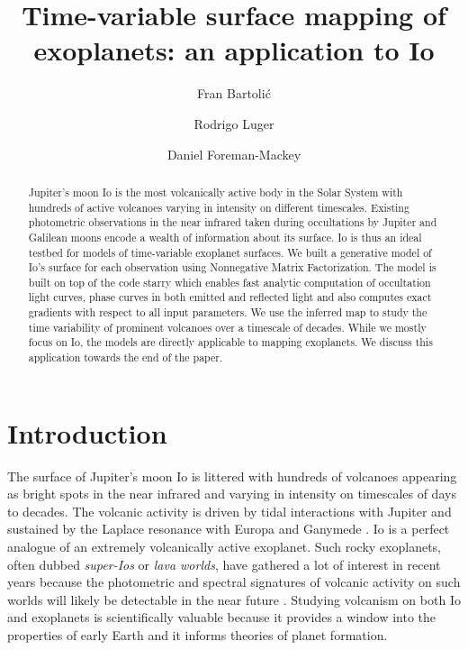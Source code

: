 \documentclass[modern]{aastex62}
\begin{document}
\title{Time-variable surface mapping of exoplanets: an application to Io}

\author{Fran Bartoli\'c}
\author{Rodrigo Luger}
\author{Daniel Foreman-Mackey}
%

\begin{abstract}
Jupiter's moon Io is the most volcanically active body in the Solar System with hundreds of active volcanoes varying in intensity on different timescales.
Existing photometric observations in the near infrared taken during occultations by Jupiter and Galilean moons encode a wealth of information about its surface.
Io is thus an ideal testbed for models of time-variable exoplanet surfaces.
We built a generative model of Io's surface for each observation using Nonnegative Matrix Factorization.
The model is built on top of the code starry \href{https://rodluger.github.io/starry/}{\color{linkcolor}\faGithub} which enables fast analytic computation of occultation light curves, phase curves in both emitted and reflected light and also computes exact gradients with respect to all input parameters.
We use the inferred map to study the time variability of prominent volcanoes over a timescale of decades.
While we mostly focus on Io, the models are directly applicable to mapping exoplanets.
We discuss this application towards the end of the paper.\href{https://github.com/fbartolic/volcano}{\color{linkcolor}\faGithub}

\end{abstract}

%
\section{Introduction}
The surface of Jupiter's moon Io is littered with hundreds of volcanoes appearing as bright spots in the near infrared and varying in intensity on timescales of days to decades.
The volcanic activity is driven by tidal interactions with Jupiter and sustained by the Laplace resonance with Europa and Ganymede \citep{peale_melting_1979}.
Io is a perfect analogue of an extremely volcanically active exoplanet.
Such rocky exoplanets, often dubbed \emph{super-Ios} or \emph{lava worlds}, have gathered a lot of interest in recent years because the photometric and spectral signatures of volcanic activity on such worlds will likely be detectable in the near future \citep{kaltenegger_detecting_2010,henning_highly_2018,oza_sodium_2019}.
Studying volcanism on both Io and exoplanets is scientifically valuable because it provides a window into the properties of early Earth and it informs theories of planet formation.
\end{document}
